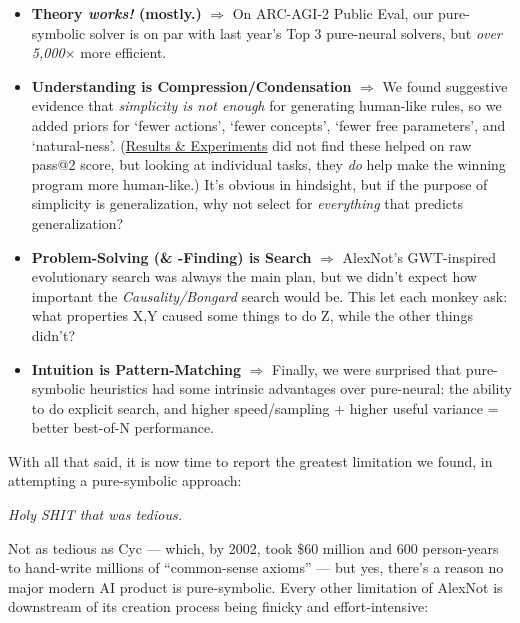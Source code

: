 \documentclass[11pt]{article}
\begin{document}
\begin{itemize}
    \item \textbf{Theory \textit{works!} (mostly.)} $\Rightarrow$ On ARC-AGI-2 Public Eval, our pure-symbolic solver is on par with last year's Top 3 pure-neural solvers, but \textit{over 5,000$\times$} more efficient.
    \item \textbf{Understanding is Compression/Condensation} $\Rightarrow$ We found suggestive evidence that \textit{simplicity is not enough} for generating human-like rules, so we added priors for `fewer actions', `fewer concepts', `fewer free parameters', and `natural-ness'. (\hyperref[sec:results]{Results \& Experiments} did not find these helped on raw pass@2 score, but looking at individual tasks, they \textit{do} help make the winning program more human-like.) It's obvious in hindsight, but if the purpose of simplicity is generalization, why not select for \textit{everything} that predicts generalization?
    \item \textbf{Problem-Solving (\& -Finding) is Search} $\Rightarrow$ AlexNot's GWT-inspired evolutionary search was always the main plan, but we didn't expect how important the \textit{Causality/Bongard} search would be. This let each monkey ask: what properties X,Y caused some things to do Z, while the other things didn't?
    \item \textbf{Intuition is Pattern-Matching} $\Rightarrow$ Finally, we were surprised that pure-symbolic heuristics had some intrinsic advantages over pure-neural: the ability to do explicit search, and higher speed/sampling + higher useful variance = better best-of-N performance.
\end{itemize}

With all that said, it is now time to report the greatest limitation we found, in attempting a pure-symbolic approach:

\textit{Holy SHIT that was tedious.}

Not as tedious as Cyc — which, by 2002, took \$60 million and 600 person-years to hand-write millions of ``common-sense axioms'' — but yes, there's a reason no major modern AI product is pure-symbolic. Every other limitation of AlexNot is downstream of its creation process being finicky and effort-intensive:
\end{document}
